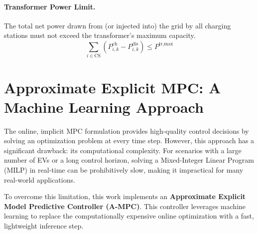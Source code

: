 \paragraph{Transformer Power Limit.} The total net power drawn from (or injected into) the grid by all charging stations must not exceed the transformer's maximum capacity.
\begin{equation}
\sum_{i \in \text{CS}} (P^{\text{ch}}_{i,k} - P^{\text{dis}}_{i,k}) \le P^{\text{tr,max}}
\end{equation}


\section{Approximate Explicit MPC: A Machine Learning Approach}
The online, implicit MPC formulation provides high-quality control decisions by solving an optimization problem at every time step. However, this approach has a significant drawback: its computational complexity. For scenarios with a large number of EVs or a long control horizon, solving a Mixed-Integer Linear Program (MILP) in real-time can be prohibitively slow, making it impractical for many real-world applications.

To overcome this limitation, this work implements an \textbf{Approximate Explicit Model Predictive Controller (A-MPC)}. This controller leverages machine learning to replace the computationally expensive online optimization with a fast, lightweight inference step.

